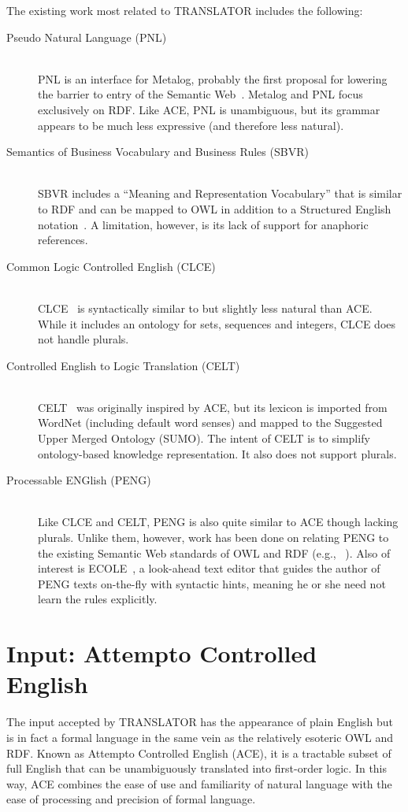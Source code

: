 \documentclass[12pt]{report}
\begin{document}
The existing work most related to TRANSLATOR includes the following:
\begin{description}
	\item[Pseudo Natural Language (PNL)]~\\PNL is an interface for Metalog, probably the first proposal for lowering the barrier to entry of the Semantic Web~\cite{metalog}. Metalog and PNL focus exclusively on RDF. Like ACE, PNL is unambiguous, but its grammar appears to be much less expressive (and therefore less natural).
	\item[Semantics of Business Vocabulary and Business Rules (SBVR)]~\\SBVR includes a ``Meaning and Representation Vocabulary'' that is similar to RDF and can be mapped to OWL in addition to a Structured English notation~\cite{sbvr}. A limitation, however, is its lack of support for anaphoric references.
	\item[Common Logic Controlled English (CLCE)]~\\CLCE~\cite{clce} is syntactically similar to but slightly less natural than ACE. While it includes an ontology for sets, sequences and integers, CLCE does not handle plurals.
	\item[Controlled English to Logic Translation (CELT)]~\\CELT~\cite{celt} was originally inspired by ACE, but its lexicon is imported from WordNet (including default word senses) and mapped to the Suggested Upper Merged Ontology (SUMO). The intent of CELT is to simplify ontology-based knowledge representation. It also does not support plurals.
	\item[Processable ENGlish (PENG)]~\\Like CLCE and CELT, PENG is also quite similar to ACE though lacking plurals. Unlike them, however, work has been done on relating PENG to the existing Semantic Web standards of OWL and RDF (e.g., ~\cite{peng}). Also of interest is ECOLE~\cite{ecole}, a look-ahead text editor that guides the author of PENG texts on-the-fly with syntactic hints, meaning he or she need not learn the rules explicitly.
\end{description}


\chapter{Input: Attempto Controlled English}
The input accepted by TRANSLATOR has the appearance of plain English but is in fact a formal language in the same vein as the relatively esoteric OWL and RDF. Known as Attempto Controlled English (ACE), it is a tractable subset of full English that can be unambiguously translated into first-order logic. In this way, ACE combines the ease of use and familiarity of natural language with the ease of processing and precision of formal language.
\end{document}
